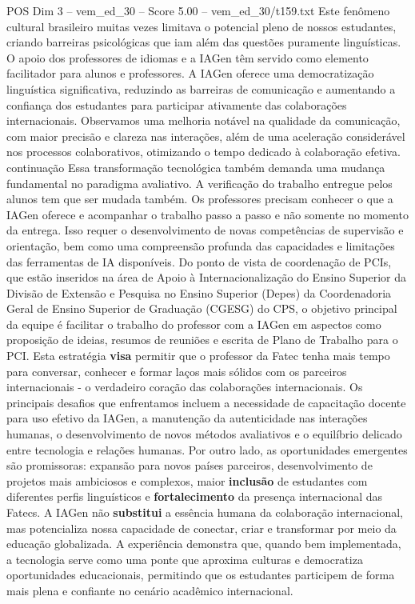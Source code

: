 \begin{textsample}{POS Dim 3 – vem\_ed\_30 – Score 5.00 – vem\_ed\_30/t159.txt}
Este fenômeno cultural brasileiro muitas vezes limitava o potencial pleno de nossos estudantes, criando barreiras psicológicas que iam além das questões puramente linguísticas.
O apoio dos professores de idiomas e a IAGen têm servido como elemento facilitador para alunos e professores.
A IAGen oferece uma democratização linguística significativa, reduzindo as barreiras de comunicação e aumentando a confiança dos estudantes para participar ativamente das colaborações internacionais.
Observamos uma melhoria notável na qualidade da comunicação, com maior precisão e clareza nas interações, além de uma aceleração considerável nos processos colaborativos, otimizando o tempo dedicado à colaboração efetiva. continuação Essa transformação tecnológica também demanda uma mudança fundamental no paradigma avaliativo.
A verificação do trabalho entregue pelos alunos tem que ser mudada também.
Os professores precisam conhecer o que a IAGen oferece e acompanhar o trabalho passo a passo e não somente no momento da entrega.
Isso requer o desenvolvimento de novas competências de supervisão e orientação, bem como uma compreensão profunda das capacidades e limitações das ferramentas de IA disponíveis.
Do ponto de vista de coordenação de PCIs, que estão inseridos na área de Apoio à Internacionalização do Ensino Superior da Divisão de Extensão e Pesquisa no Ensino Superior (Depes) da Coordenadoria Geral de Ensino Superior de Graduação (CGESG) do CPS, o objetivo principal da equipe é facilitar o trabalho do professor com a IAGen em aspectos como proposição de ideias, resumos de reuniões e escrita de Plano de Trabalho para o PCI.
Esta estratégia \textbf{visa} permitir que o professor da Fatec tenha mais tempo para conversar, conhecer e formar laços mais sólidos com os parceiros internacionais - o verdadeiro coração das colaborações internacionais.
Os principais desafios que enfrentamos incluem a necessidade de capacitação docente para uso efetivo da IAGen, a manutenção da autenticidade nas interações humanas, o desenvolvimento de novos métodos avaliativos e o equilíbrio delicado entre tecnologia e relações humanas.
Por outro lado, as oportunidades emergentes são promissoras: expansão para novos países parceiros, desenvolvimento de projetos mais ambiciosos e complexos, maior \textbf{inclusão} de estudantes com diferentes perfis linguísticos e \textbf{fortalecimento} da presença internacional das Fatecs.
A IAGen não \textbf{substitui} a essência humana da colaboração internacional, mas potencializa nossa capacidade de conectar, criar e transformar por meio da educação globalizada.
A experiência demonstra que, quando bem implementada, a tecnologia serve como uma ponte que aproxima culturas e democratiza oportunidades educacionais, permitindo que os estudantes participem de forma mais plena e confiante no cenário acadêmico internacional.

\end{textsample}
